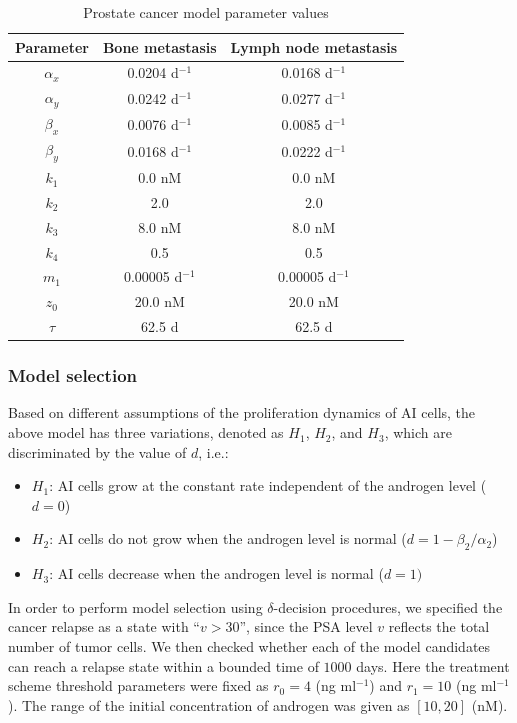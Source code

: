 \begin{table}[h]
\caption{Prostate cancer model parameter values\label{prostate}}
\centering
\begin{tabular}{c|c|c}
\hline
Parameter  & Bone metastasis & Lymph node metastasis  \\\hline
$\alpha_x$ & 0.0204 d$^{-1}$ & 0.0168 d$^{-1}$  \\
$\alpha_y$ & 0.0242 d$^{-1}$ & 0.0277 d$^{-1}$  \\
$\beta_x$  & 0.0076 d$^{-1}$ & 0.0085 d$^{-1}$  \\
$\beta_y$  & 0.0168 d$^{-1}$ & 0.0222 d$^{-1}$  \\
$k_1$     & 0.0 nM & 0.0 nM \\
$k_2$     & 2.0 & 2.0  \\
$k_3$     & 8.0 nM & 8.0 nM \\
$k_4$     & 0.5 & 0.5  \\
$m_1$     & 0.00005 d$^{-1}$ & 0.00005 d$^{-1}$  \\
$z_0$     & 20.0 nM & 20.0 nM  \\
$\tau$     & 62.5 d & 62.5 d \\
\hline
\end{tabular}
\end{table}

\subsubsection{Model selection}
Based on different assumptions of the proliferation dynamics of AI cells, the above model has three variations, denoted as $H_1$, $H_2$, and $H_3$, which are discriminated by the value of $d$, i.e.:
\begin{itemize}
\item $H_1$: AI cells grow at the constant rate independent of the androgen level ($d=0$)\\
\item $H_2$: AI cells do not grow when the androgen level is normal ($d=1-\beta_2/\alpha_2$)\\
\item $H_3$: AI cells decrease when the androgen level is normal ($d=1)$
\end{itemize}

In order to perform model selection using $\delta$-decision procedures, we specified the cancer relapse as a state with ``$v>30$'', since the PSA level $v$ reflects the total number of tumor cells. We then checked whether each of the model candidates can reach a relapse state within a bounded time of $1000$ days. Here the treatment scheme threshold parameters were fixed as $r_0=4$ (ng ml$^{-1}$) and $r_1=10$ (ng ml$^{-1}$). The range of the initial concentration of androgen was given as $[10, 20]$ (nM).

